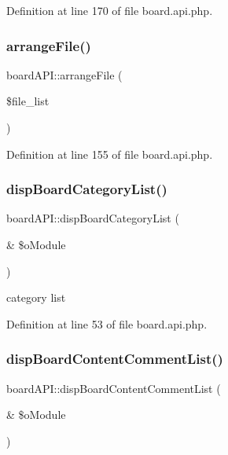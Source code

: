 Definition at line 170 of file board.\+api.\+php.

\mbox{\label{classboardAPI_a01e0faec8a6509f75271f226c9be5004}} 
\subsubsection{\texorpdfstring{arrange\+File()}{arrangeFile()}}
{\footnotesize\ttfamily board\+A\+P\+I\+::arrange\+File (\begin{DoxyParamCaption}\item[{}]{\$file\+\_\+list }\end{DoxyParamCaption})}



Definition at line 155 of file board.\+api.\+php.

\mbox{\label{classboardAPI_aa527b1afc48bacd728b5d95e969a60f6}} 
\subsubsection{\texorpdfstring{disp\+Board\+Category\+List()}{dispBoardCategoryList()}}
{\footnotesize\ttfamily board\+A\+P\+I\+::disp\+Board\+Category\+List (\begin{DoxyParamCaption}\item[{\&}]{\$o\+Module }\end{DoxyParamCaption})}



category list 



Definition at line 53 of file board.\+api.\+php.

\mbox{\label{classboardAPI_af5b1506259e5aaec1b6f743ac6548203}} 
\subsubsection{\texorpdfstring{disp\+Board\+Content\+Comment\+List()}{dispBoardContentCommentList()}}
{\footnotesize\ttfamily board\+A\+P\+I\+::disp\+Board\+Content\+Comment\+List (\begin{DoxyParamCaption}\item[{\&}]{\$o\+Module }\end{DoxyParamCaption})}



